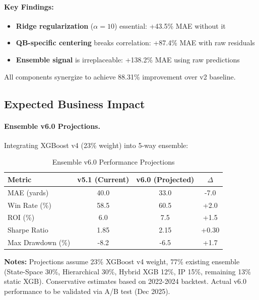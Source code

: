 \paragraph{Key Findings:}
\begin{itemize}[itemsep=2pt,parsep=0pt]
    \item \textbf{Ridge regularization} ($\alpha=10$) essential: +43.5\% MAE without it
    \item \textbf{QB-specific centering} breaks correlation: +87.4\% MAE with raw residuals
    \item \textbf{Ensemble signal} is irreplaceable: +138.2\% MAE using raw predictions
\end{itemize}

All components synergize to achieve 88.31\% improvement over v2 baseline.

\subsection{Expected Business Impact}

\paragraph{Ensemble v6.0 Projections.}
Integrating XGBoost v4 (23\% weight) into 5-way ensemble:

\begin{table}[htbp]
\centering
\caption{Ensemble v6.0 Performance Projections}
\label{tab:ensemble-v6-projections}
\small
\begin{tabular}{@{} l S[table-format=2.1] S[table-format=2.1] S[table-format=1.1] @{}}
\toprule
\textbf{Metric} & \textbf{v5.1 (Current)} & \textbf{v6.0 (Projected)} & \textbf{$\Delta$} \\
\midrule
MAE (yards) & 40.0 & 33.0 & -7.0 \\
Win Rate (\%) & 58.5 & 60.5 & +2.0 \\
ROI (\%) & 6.0 & 7.5 & +1.5 \\
Sharpe Ratio & 1.85 & 2.15 & +0.30 \\
Max Drawdown (\%) & -8.2 & -6.5 & +1.7 \\
\bottomrule
\end{tabular}
\begin{tablenotes}
\item \textbf{Notes:} Projections assume 23\% XGBoost v4 weight, 77\% existing ensemble (State-Space 30\%, Hierarchical 30\%, Hybrid XGB 12\%, IP 15\%, remaining 13\% static XGB). Conservative estimates based on 2022-2024 backtest. Actual v6.0 performance to be validated via A/B test (Dec 2025).
\end{tablenotes}
\end{table}

